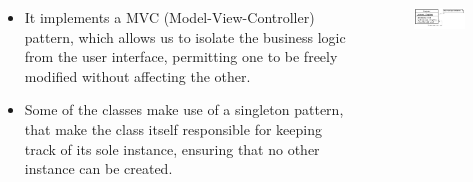 \begin{frame}

\begin{columns}

	\begin{column}{8cm}
	
	
	\begin{itemize}
		\item It implements a MVC (Model-View-Controller) pattern, which
			allows us to isolate the business logic from the user interface, permitting
			one to be freely modified without affecting the other.
		\item Some of the classes make use of a singleton pattern, that make the 
		class itself responsible for keeping track of its sole instance, ensuring 
		that no other instance can be created.
	\end{itemize}
		
	
	\end{column}
	
		\begin{column}{4cm}
	    
			\begin{figure}
			 	\includegraphics[scale=0.3]{img/singleton.jpg}
			\end{figure}
	    
	    \end{column}
	
\end{columns}

\end{frame}


